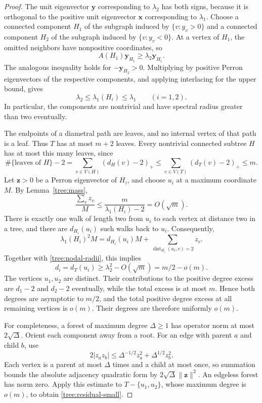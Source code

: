\documentclass[11pt,a4paper]{article}
\numberwithin{equation}{section}
\theoremstyle{definition}
\theoremstyle{remark}
\begin{document}
\begin{proof}
The unit eigenvector $\mathbf y$ corresponding to $\lambda_2$ has
both signs, because it is orthogonal to the positive unit eigenvector
$\mathbf x$ corresponding to $\lambda_1$. Choose a connected
component $H_1$ of the subgraph induced by $\{v:y_v>0\}$ and a
connected component $H_2$ of the subgraph induced by $\{v:y_v<0\}$.
At a vertex of $H_1$, the omitted neighbors have nonpositive
coordinates, so
\[
 A(H_1)\mathbf y_{H_1}\geq\lambda_2\mathbf y_{H_1}.
\]
The analogous inequality holds for $-\mathbf y_{H_2}>0$.
Multiplying by positive Perron eigenvectors of the respective
components, and applying interlacing for the upper bound, gives
\begin{equation}\label{tree:nodal-radii}
 \lambda_2\leq\lambda_1(H_i)\leq\lambda_1
 \qquad(i=1,2).
\end{equation}
In particular, the components are nontrivial and have spectral radius
greater than two eventually.

The endpoints of a diametral path are leaves, and no internal vertex
of that path is a leaf. Thus $T$ has at most $m+2$ leaves. Every
nontrivial connected subtree $H$ has at most this many leaves, since
\[
 \#\{\text{leaves of }H\}-2
 =\sum_{v\in V(H)}(d_H(v)-2)_+
 \leq\sum_{v\in V(T)}(d_T(v)-2)_+\leq m.
\]
Let $\mathbf z>0$ be a Perron eigenvector of $H_i$, and choose
$u_i$ at a maximum coordinate $M$. By Lemma~\ref{tree:mass},
\[
 \frac{\sum_v z_v}{M}
 \leq\frac{m}{\lambda_1(H_i)-2}=O(\sqrt m).
\]
There is exactly one walk of length two from $u_i$ to each vertex
at distance two in a tree, and there are $d_{H_i}(u_i)$ such walks
back to $u_i$. Consequently,
\[
 \lambda_1(H_i)^2M
 =d_{H_i}(u_i)M+
   \sum_{\operatorname{dist}_{H_i}(u_i,v)=2}z_v.
\]
Together with \eqref{tree:nodal-radii}, this implies
\[
 d_i=d_T(u_i)\geq\lambda_2^2-O(\sqrt m)=m/2-o(m).
\]
The vertices $u_1,u_2$ are distinct. Their contributions to the
positive degree excess are $d_1-2$ and $d_2-2$ eventually, while the
total excess is at most $m$. Hence both degrees are asymptotic to
$m/2$, and the total positive degree excess at all remaining vertices
is $o(m)$. Their degrees are therefore uniformly $o(m)$.

For completeness, a forest of maximum degree $\Delta\geq1$ has
operator norm at most $2\sqrt\Delta$. Orient each component away
from a root. For an edge with parent $a$ and child $b$, use
\[
 2|z_a z_b|\leq\Delta^{-1/2}z_a^2+\Delta^{1/2}z_b^2.
\]
Each vertex is a parent at most $\Delta$ times and a child at most
once, so summation bounds the absolute adjacency quadratic form by
$2\sqrt\Delta\lVert\mathbf z\rVert^2$. An edgeless forest has norm
zero. Apply this estimate to $T-\{u_1,u_2\}$, whose maximum degree
is $o(m)$, to obtain \eqref{tree:residual-small}.
\end{proof}
\end{document}
